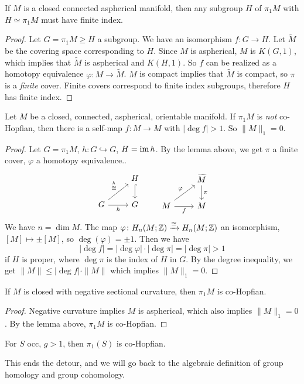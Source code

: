 \begin{lemma}
    If $M$ is a closed connected aspherical manifold, then any subgroup $H$ of $\pi_1 M$ with $H \simeq  \pi_1 M$ must have finite index.
\end{lemma}
\begin{proof}
    Let $G=\pi_1 M \geq H$ a subgroup. We have an isomorphism $f \colon G \to H$. Let $\widetilde M$ be the covering space corresponding to $H$. Since $M$ is aspherical,  $M$ is $K(G,1)$, which implies that $\widetilde M$ is aspherical and $K(H,1)$. So $f$ can be realized as a homotopy equivalence $\varphi  \colon M \to \widetilde M$. $M$ is compact implies that $\widetilde M$ is compact, so $\pi$ is a \emph{finite} cover. Finite covers correspond to finite index subgroups, therefore $H$ has finite index.
\end{proof}
\begin{lemma}
    Let $M$ be a closed, connected, aspherical, orientable manifold. If $\pi_1M$ is \emph{not} co-Hopfian, then there is a self-map $f \colon M \to M$ with $|\deg f | >1$. So $\|M\|_1=0$.
\end{lemma}
\begin{proof}
    Let $G=\pi_1 M$, $h \colon G \hookrightarrow  G$, $H=\operatorname{im} h$. By the lemma above, we get $\pi$ a finite cover, $\varphi $ a homotopy equivalence..
\[
\begin{tikzcd}
                                                   & H \arrow[d, hook] \\
G \arrow[r, "h"'] \arrow[ru, "\overset{h}{\cong}"] & G                
\end{tikzcd}\qquad
\begin{tikzcd}
                                        & \widetilde M \arrow[d, "\pi"] \\
M \arrow[ru, "\varphi"] \arrow[r, "f"'] & M                            
\end{tikzcd}
\] 
    We have $n=\dim M$. The map $\varphi \colon H_n (M;\mathbb{Z}) \xrightarrow{\cong} H_n (M;\mathbb{Z}) $ an isomorphism, $[M] \mapsto  \pm [M]$, so $\deg (\varphi)=\pm 1$. Then we have \[
        |\deg f| = |\deg \varphi | \cdot |\deg \pi| = |\deg \pi| > 1
    \] if $H$ is proper, where $\deg \pi$ is the index of $H$ in $G$. By the degree inequality, we get $\|M\|\leq |\deg f| \cdot \|M\| $ which implies $\|M\|_1=0$.
\end{proof}
\begin{cor}
    If $M$ is closed with negative sectional curvature, then $\pi_1 M$ is co-Hopfian.
\end{cor}
\begin{proof}
    Negative curvature implies $M$ is aspherical, which also implies $\|M\|_1=0$. By the lemma above, $\pi_1 M$ is co-Hopfian.
\end{proof}
\begin{example}
    For $S$ occ, $g>1$, then $\pi_1 (S)$ is co-Hopfian.
\end{example}
This ends the detour, and we will go back to the algebraic definition of group homology and group cohomology.

